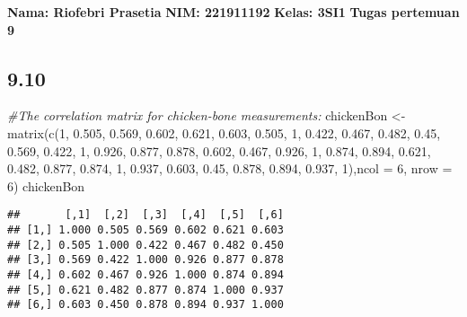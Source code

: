 \documentclass[
]{article}
\author{}
\date{\vspace{-2.5em}}
\newenvironment{Shaded}{\begin{snugshade}}{\end{snugshade}}
\newcommand{\AttributeTok}[1]{\textcolor[rgb]{0.77,0.63,0.00}{#1}}
\newcommand{\CommentTok}[1]{\textcolor[rgb]{0.56,0.35,0.01}{\textit{#1}}}
\newcommand{\DecValTok}[1]{\textcolor[rgb]{0.00,0.00,0.81}{#1}}
\newcommand{\FloatTok}[1]{\textcolor[rgb]{0.00,0.00,0.81}{#1}}
\newcommand{\FunctionTok}[1]{\textcolor[rgb]{0.00,0.00,0.00}{#1}}
\newcommand{\NormalTok}[1]{#1}
\newcommand{\OtherTok}[1]{\textcolor[rgb]{0.56,0.35,0.01}{#1}}
\begin{document}
\textbf{Nama: Riofebri Prasetia} \textbf{NIM: 221911192} \textbf{Kelas:
3SI1} \textbf{Tugas pertemuan 9}

\hypertarget{section}{%
\subsection{9.10}\label{section}}

\begin{Shaded}
\begin{Highlighting}[]
\CommentTok{\#The correlation matrix for chicken{-}bone measurements:}
\NormalTok{chickenBon }\OtherTok{\textless{}{-}} \FunctionTok{matrix}\NormalTok{(}\FunctionTok{c}\NormalTok{(}\DecValTok{1}\NormalTok{, }\FloatTok{0.505}\NormalTok{, }\FloatTok{0.569}\NormalTok{, }\FloatTok{0.602}\NormalTok{, }\FloatTok{0.621}\NormalTok{, }\FloatTok{0.603}\NormalTok{,}
                 \FloatTok{0.505}\NormalTok{, }\DecValTok{1}\NormalTok{, }\FloatTok{0.422}\NormalTok{, }\FloatTok{0.467}\NormalTok{, }\FloatTok{0.482}\NormalTok{, }\FloatTok{0.45}\NormalTok{,}
                 \FloatTok{0.569}\NormalTok{, }\FloatTok{0.422}\NormalTok{, }\DecValTok{1}\NormalTok{, }\FloatTok{0.926}\NormalTok{, }\FloatTok{0.877}\NormalTok{, }\FloatTok{0.878}\NormalTok{,}
                 \FloatTok{0.602}\NormalTok{, }\FloatTok{0.467}\NormalTok{, }\FloatTok{0.926}\NormalTok{, }\DecValTok{1}\NormalTok{, }\FloatTok{0.874}\NormalTok{, }\FloatTok{0.894}\NormalTok{,}
                 \FloatTok{0.621}\NormalTok{, }\FloatTok{0.482}\NormalTok{, }\FloatTok{0.877}\NormalTok{, }\FloatTok{0.874}\NormalTok{, }\DecValTok{1}\NormalTok{, }\FloatTok{0.937}\NormalTok{,}
                 \FloatTok{0.603}\NormalTok{, }\FloatTok{0.45}\NormalTok{, }\FloatTok{0.878}\NormalTok{, }\FloatTok{0.894}\NormalTok{, }\FloatTok{0.937}\NormalTok{, }\DecValTok{1}\NormalTok{),}\AttributeTok{ncol =} \DecValTok{6}\NormalTok{, }\AttributeTok{nrow =} \DecValTok{6}\NormalTok{)}
\NormalTok{chickenBon}
\end{Highlighting}
\end{Shaded}

\begin{verbatim}
##       [,1]  [,2]  [,3]  [,4]  [,5]  [,6]
## [1,] 1.000 0.505 0.569 0.602 0.621 0.603
## [2,] 0.505 1.000 0.422 0.467 0.482 0.450
## [3,] 0.569 0.422 1.000 0.926 0.877 0.878
## [4,] 0.602 0.467 0.926 1.000 0.874 0.894
## [5,] 0.621 0.482 0.877 0.874 1.000 0.937
## [6,] 0.603 0.450 0.878 0.894 0.937 1.000
\end{verbatim}
\end{document}
